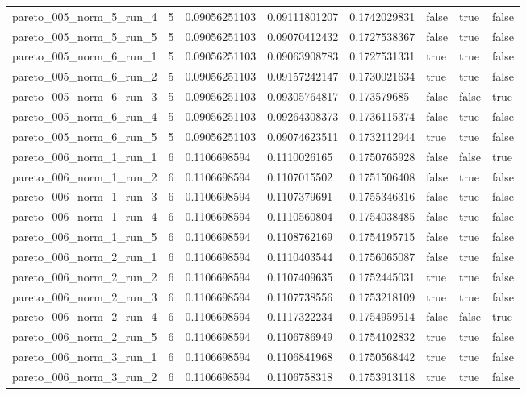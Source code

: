 \begin{tabular}{@{}llllllll@{}}
pareto\_005\_norm\_5\_run\_4 & 5 & 0.09056251103 & 0.09111801207 & 0.1742029831 & false & true & false \\
pareto\_005\_norm\_5\_run\_5 & 5 & 0.09056251103 & 0.09070412432 & 0.1727538367 & false & true & false \\
pareto\_005\_norm\_6\_run\_1 & 5 & 0.09056251103 & 0.09063908783 & 0.1727531331 & true & true & false \\
pareto\_005\_norm\_6\_run\_2 & 5 & 0.09056251103 & 0.09157242147 & 0.1730021634 & true & true & false \\
pareto\_005\_norm\_6\_run\_3 & 5 & 0.09056251103 & 0.09305764817 & 0.173579685 & false & false & true \\
pareto\_005\_norm\_6\_run\_4 & 5 & 0.09056251103 & 0.09264308373 & 0.1736115374 & false & true & false \\
pareto\_005\_norm\_6\_run\_5 & 5 & 0.09056251103 & 0.09074623511 & 0.1732112944 & true & true & false \\
pareto\_006\_norm\_1\_run\_1 & 6 & 0.1106698594 & 0.1110026165 & 0.1750765928 & false & false & true \\
pareto\_006\_norm\_1\_run\_2 & 6 & 0.1106698594 & 0.1107015502 & 0.1751506408 & false & true & false \\
pareto\_006\_norm\_1\_run\_3 & 6 & 0.1106698594 & 0.1107379691 & 0.1755346316 & false & true & false \\
pareto\_006\_norm\_1\_run\_4 & 6 & 0.1106698594 & 0.1110560804 & 0.1754038485 & false & true & false \\
pareto\_006\_norm\_1\_run\_5 & 6 & 0.1106698594 & 0.1108762169 & 0.1754195715 & false & true & false \\
pareto\_006\_norm\_2\_run\_1 & 6 & 0.1106698594 & 0.1110403544 & 0.1756065087 & false & true & false \\
pareto\_006\_norm\_2\_run\_2 & 6 & 0.1106698594 & 0.1107409635 & 0.1752445031 & true & true & false \\
pareto\_006\_norm\_2\_run\_3 & 6 & 0.1106698594 & 0.1107738556 & 0.1753218109 & true & true & false \\
pareto\_006\_norm\_2\_run\_4 & 6 & 0.1106698594 & 0.1117322234 & 0.1754959514 & false & false & true \\
pareto\_006\_norm\_2\_run\_5 & 6 & 0.1106698594 & 0.1106786949 & 0.1754102832 & true & true & false \\
pareto\_006\_norm\_3\_run\_1 & 6 & 0.1106698594 & 0.1106841968 & 0.1750568442 & true & true & false \\
pareto\_006\_norm\_3\_run\_2 & 6 & 0.1106698594 & 0.1106758318 & 0.1753913118 & true & true & false \\

\end{tabular}
